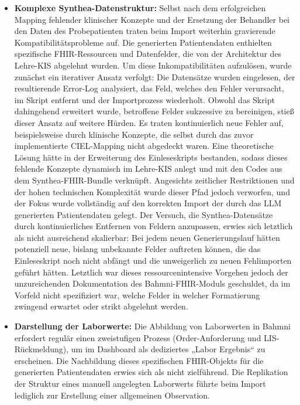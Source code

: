 \begin{description}[style=nextline, font=\bfseries]
\begin{itemize}[leftmargin=1.5em, labelsep=0.5em, itemsep=4pt, topsep=4pt]
        \item \textbf{Komplexe Synthea-Datenstruktur:} Selbst nach dem erfolgreichen Mapping fehlender klinischer Konzepte und der Ersetzung der Behandler bei den Daten des Probepatienten traten beim Import weiterhin gravierende Kompatibilitätsprobleme auf. Die generierten Patientendaten enthielten spezifische FHIR-Ressourcen und Datenfelder, die von der Architektur des Lehre-KIS abgelehnt wurden. Um diese Inkompatibilitäten aufzulösen, wurde zunächst ein iterativer Ansatz verfolgt: Die Datensätze wurden eingelesen, der resultierende Error-Log analysiert, das Feld, welches den Fehler verursacht, im Skript entfernt und der Importprozess wiederholt. Obwohl das Skript dahingehend erweitert wurde, betroffene Felder sukzessive zu bereinigen, stieß dieser Ansatz auf weitere Hürden. Es traten kontinuierlich neue Fehler auf, beispielsweise durch klinische Konzepte, die selbst durch das zuvor implementierte CIEL-Mapping nicht abgedeckt waren. Eine theoretische Lösung hätte in der Erweiterung des Einleseskripts bestanden, sodass dieses fehlende Konzepte dynamisch im Lehre-KIS anlegt und mit den Codes aus dem Synthea-FHIR-Bundle verknüpft. Angesichts zeitlicher Restriktionen und der hohen technischen Komplexität wurde dieser Pfad jedoch verworfen, und der Fokus wurde vollständig auf den korrekten Import der durch das LLM generierten Patientendaten gelegt. Der Versuch, die Synthea-Datensätze durch kontinuierliches Entfernen von Feldern anzupassen, erwies sich letztlich als nicht ausreichend skalierbar: Bei jedem neuen Generierungslauf hätten potenziell neue, bislang unbekannte Felder auftreten können, die das Einleseskript noch nicht abfängt und die unweigerlich zu neuen Fehlimporten geführt hätten. Letztlich war dieses ressourcenintensive Vorgehen jedoch der unzureichenden Dokumentation des Bahmni-FHIR-Moduls geschuldet, da im Vorfeld nicht spezifiziert war, welche Felder in welcher Formatierung zwingend erwartet oder strikt abgelehnt werden.
        
        \item \textbf{Darstellung der Laborwerte:} Die Abbildung von Laborwerten in Bahmni erfordert regulär einen zweistufigen Prozess (Order-Anforderung und LIS-Rückmeldung), um im Dashboard als dediziertes „Labor Ergebnis“ zu erscheinen. Die Nachbildung dieses spezifischen FHIR-Objekts für die generierten Patientendaten erwies sich als nicht zielführend. Die Replikation der Struktur eines manuell angelegten Laborwerts führte beim Import lediglich zur Erstellung einer allgemeinen Observation.
    \end{itemize}


\end{description}

